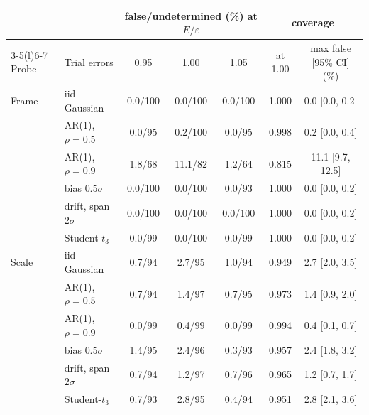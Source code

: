 \begin{tabular}{@{}llccccc@{}}\toprule
 & & \multicolumn{3}{c}{false/undetermined (\%) at $E/\varepsilon$} & \multicolumn{2}{c}{coverage} \\\cmidrule(lr){3-5}\cmidrule(l){6-7}
Probe & Trial errors & 0.95 & 1.00 & 1.05 & at 1.00 & max false [95\% CI] (\%) \\\midrule
Frame & iid Gaussian & 0.0/100 & 0.0/100 & 0.0/100 & 1.000 & 0.0 [0.0, 0.2] \\
 & AR(1), $\rho=0.5$ & 0.0/95 & 0.2/100 & 0.0/95 & 0.998 & 0.2 [0.0, 0.4] \\
 & AR(1), $\rho=0.9$ & 1.8/68 & 11.1/82 & 1.2/64 & 0.815 & 11.1 [9.7, 12.5] \\
 & bias $0.5\sigma$ & 0.0/100 & 0.0/100 & 0.0/93 & 1.000 & 0.0 [0.0, 0.2] \\
 & drift, span $2\sigma$ & 0.0/100 & 0.0/100 & 0.0/100 & 1.000 & 0.0 [0.0, 0.2] \\
 & Student-$t_3$ & 0.0/99 & 0.0/100 & 0.0/99 & 1.000 & 0.0 [0.0, 0.2] \\
\addlinespace
Scale & iid Gaussian & 0.7/94 & 2.7/95 & 1.0/94 & 0.949 & 2.7 [2.0, 3.5] \\
 & AR(1), $\rho=0.5$ & 0.7/94 & 1.4/97 & 0.7/95 & 0.973 & 1.4 [0.9, 2.0] \\
 & AR(1), $\rho=0.9$ & 0.0/99 & 0.4/99 & 0.0/99 & 0.994 & 0.4 [0.1, 0.7] \\
 & bias $0.5\sigma$ & 1.4/95 & 2.4/96 & 0.3/93 & 0.957 & 2.4 [1.8, 3.2] \\
 & drift, span $2\sigma$ & 0.7/94 & 1.2/97 & 0.7/96 & 0.965 & 1.2 [0.7, 1.7] \\
 & Student-$t_3$ & 0.7/93 & 2.8/95 & 0.4/94 & 0.951 & 2.8 [2.1, 3.6] \\
\bottomrule\end{tabular}
